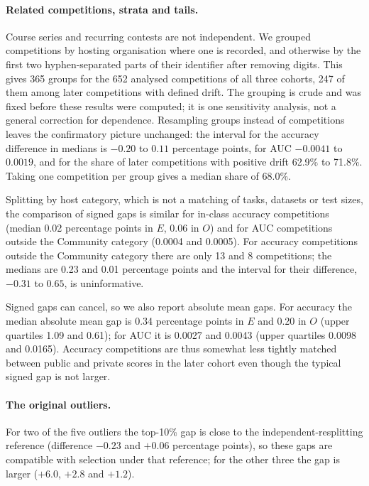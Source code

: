 \documentclass[10pt]{article}
\begin{document}
\paragraph{Related competitions, strata and tails.} Course series and recurring contests are not independent. We grouped competitions by hosting organisation where one is recorded, and otherwise by the first two hyphen-separated parts of their identifier after removing digits. This gives 365 groups for the 652 analysed competitions of all three cohorts, 247 of them among later competitions with defined drift. The grouping is crude and was fixed before these results were computed; it is one sensitivity analysis, not a general correction for dependence. Resampling groups instead of competitions leaves the confirmatory picture unchanged: the interval for the accuracy difference in medians is $-0.20$ to $0.11$ percentage points, for AUC $-0.0041$ to $0.0019$, and for the share of later competitions with positive drift 62.9\% to 71.8\%. Taking one competition per group gives a median share of 68.0\%.

Splitting by host category, which is not a matching of tasks, datasets or test sizes, the comparison of signed gaps is similar for in-class accuracy competitions (median 0.02 percentage points in $E$, 0.06 in $O$) and for AUC competitions outside the Community category (0.0004 and 0.0005). For accuracy competitions outside the Community category there are only 13 and 8 competitions; the medians are 0.23 and 0.01 percentage points and the interval for their difference, $-0.31$ to $0.65$, is uninformative.

Signed gaps can cancel, so we also report absolute mean gaps. For accuracy the median absolute mean gap is 0.34 percentage points in $E$ and 0.20 in $O$ (upper quartiles 1.09 and 0.61); for AUC it is 0.0027 and 0.0043 (upper quartiles 0.0098 and 0.0165). Accuracy competitions are thus somewhat less tightly matched between public and private scores in the later cohort even though the typical signed gap is not larger.

\paragraph{The original outliers.} For two of the five outliers the top-10\% gap is close to the independent-resplitting reference (difference $-0.23$ and $+0.06$ percentage points), so these gaps are compatible with selection under that reference; for the other three the gap is larger ($+6.0$, $+2.8$ and $+1.2$).
\end{document}
